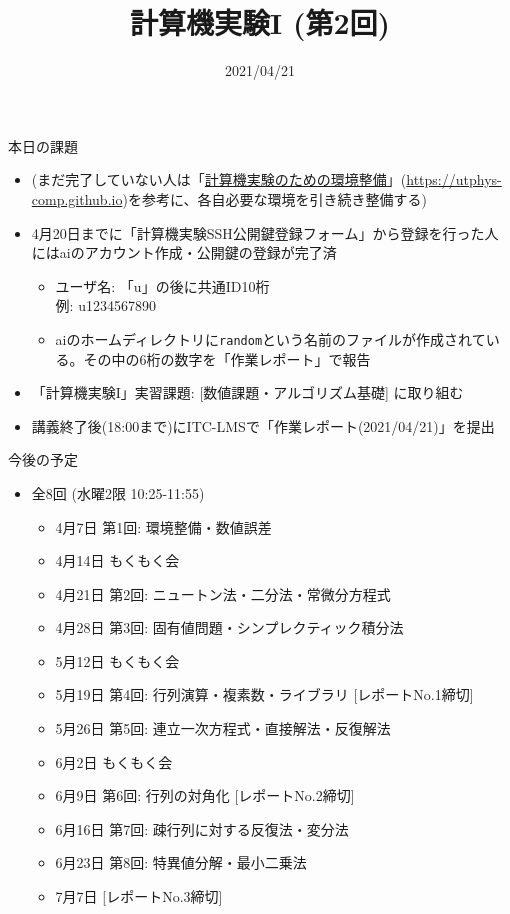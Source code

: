 \documentclass[10pt,dvipdfmx]{beamer}
\title{計算機実験I (第2回)}
\date{2021/04/21}
\begin{document}
\begin{frame}
  \titlepage
  \tableofcontents
\end{frame}

\begin{frame}[t]{本日の課題}
  \begin{itemize}
  \item (まだ完了していない人は「\href{https://utphys-comp.github.io}{計算機実験のための環境整備}」({\small \href{https://utphys-comp.github.io}{https://utphys-comp.github.io}})を参考に、各自必要な環境を引き続き整備する)
  \item 4月20日までに「計算機実験SSH公開鍵登録フォーム」から登録を行った人にはaiのアカウント作成・公開鍵の登録が完了済
    \begin{itemize}
    \item ユーザ名: 「u」の後に共通ID10桁 \\ 例: u1234567890
    \item aiのホームディレクトリに{\tt random}という名前のファイルが作成されている。その中の6桁の数字を「作業レポート」で報告
    \end{itemize}
  \item 「計算機実験I」実習課題: [数値課題・アルゴリズム基礎] に取り組む
  \item 講義終了後(18:00まで)にITC-LMSで「作業レポート(2021/04/21)」を提出
  \end{itemize}
\end{frame}







\begin{frame}[t]{今後の予定}
  \begin{itemize}
  \item 全8回 (水曜2限 10:25-11:55)
    \begin{itemize}
    \item {\color{gray} 4月7日 第1回: 環境整備・数値誤差}
    \item {\color{gray} 4月14日 もくもく会}
    \item {\color{gray} 4月21日 第2回: ニュートン法・二分法・常微分方程式}
    \item 4月28日 第3回: 固有値問題・シンプレクティック積分法
    \item 5月12日 もくもく会
    \item 5月19日 第4回: 行列演算・複素数・ライブラリ [レポートNo.1締切]
    \item 5月26日 第5回: 連立一次方程式・直接解法・反復解法
    \item 6月2日 もくもく会
    \item 6月9日 第6回: 行列の対角化 [レポートNo.2締切]
    \item 6月16日 第7回: 疎行列に対する反復法・変分法
    \item 6月23日 第8回: 特異値分解・最小二乗法
    \item 7月7日 [レポートNo.3締切]
     \end{itemize}
  \end{itemize}
\end{frame}
\end{document}

